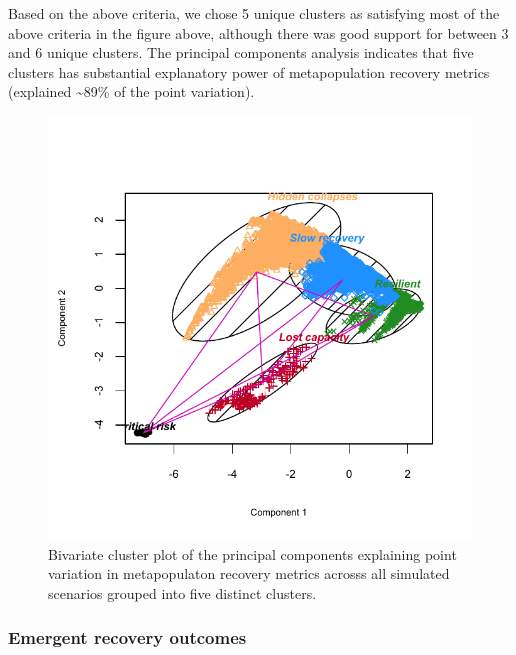 \documentclass[
]{article}
\begin{document}
Based on the above criteria, we chose 5 unique clusters as satisfying
most of the above criteria in the figure above, although there was good
support for between 3 and 6 unique clusters. The principal components
analysis indicates that five clusters has substantial explanatory power
of metapopulation recovery metrics (explained \textasciitilde89\% of the
point variation).

\begin{figure}[H]

{\centering \includegraphics{Managing_for_ecological_surprises_in_metapopulations_files/figure-latex/clustering plot-1} 

}

\caption{Bivariate cluster plot of the principal components explaining point variation in metapopulaton recovery metrics acrosss all simulated scenarios grouped into five distinct clusters.}\label{fig:clustering plot}
\end{figure}

\hypertarget{emergent-recovery-outcomes}{%
\subsubsection{Emergent recovery
outcomes}\label{emergent-recovery-outcomes}}
\end{document}
